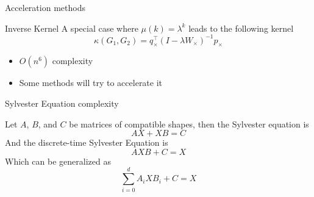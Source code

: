 \documentclass[compress]{beamer}
\begin{document}
\begin{frame}{Acceleration methods}
\begin{block}{Inverse Kernel}
A special case where $\mu(k)=\lambda^k$ leads to the following kernel
	\begin{equation*}
	\kappa(G_1,G_2)=q_{\times}^{\top}(I-\lambda W_\times)^{-1}p_{\times}
	\end{equation*}
\end{block}
\begin{itemize}
	\item $O(n^6)$ complexity
	\item Some methods will try to accelerate it
\end{itemize}
\end{frame}
\begin{frame}{Sylvester Equation}
complexity
\begin{definition}
	Let $A$, $B$, and $C$ be matrices of compatible shapes, then the Sylvester equation is
	\begin{equation*}
	AX+XB=C
	\end{equation*}
	And the discrete-time Sylvester Equation is 
	\begin{equation*}
	AXB+C=X
	\end{equation*}
	Which can be generalized as
	\begin{equation*}
	\sum_{i=0}^{d}A_{i}XB_{i}+C=X
	\end{equation*}
\end{definition}
\end{frame}
\end{document}
